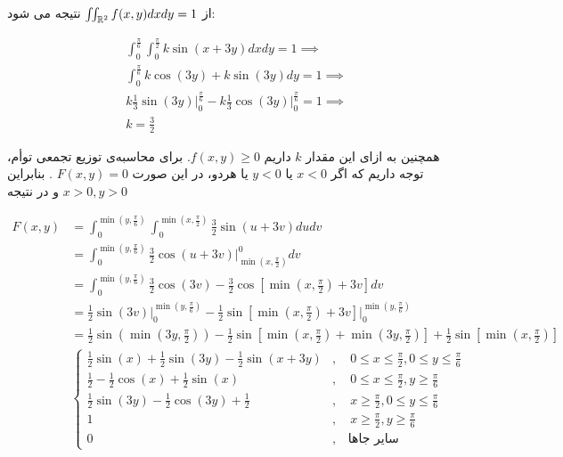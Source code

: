 \documentclass{article}
\newcommand{\eqn}[1]{
\begin{equation}\begin{split}
#1
\end{split}\end{equation}
}
\begin{document}
از 
$
\iint_{\Bbb R^2}f(x,y)dxdy=1
$
نتیجه می شود:
\eqn{
&\int_0^\frac{\pi}{6}\int_0^\frac{\pi}{2}k\sin(x+3y)dxdy=1\implies
\\&\int_0^\frac{\pi}{6}k\cos(3y)+k\sin(3y)dy=1\implies
\\&k\frac{1}{3}\sin(3y)\Big|_0^\frac{\pi}{6}-k\frac{1}{3}\cos(3y)\Big|_0^\frac{\pi}{6}=1\implies
\\&k=\frac{3}{2}
}
همچنین به ازای این مقدار $k$ داریم
$
f(x,y)\ge 0
$.
برای محاسبه‌ی توزیع تجمعی توأم، توجه داریم که اگر 
$
x<0
$
یا 
$
y<0
$
یا هردو، در این صورت
$
F(x,y)=0
$
.
بنابراین 
$
x>0,y>0
$
و در نتیجه
\eqn{
F(x,y)&=
\int_0^{\min(y,\frac{\pi}{6})}\int_0^{\min(x,\frac{\pi}{2})} \frac{3}{2}\sin(u+3v)dudv
\\&=
\int_0^{\min(y,\frac{\pi}{6})} \frac{3}{2}\cos(u+3v)\Big|_{\min(x,\frac{\pi}{2})}^0dv
\\&=
\int_0^{\min(y,\frac{\pi}{6})} \frac{3}{2}\cos(3v)-\frac{3}{2}\cos\left[\min(x,\frac{\pi}{2})+3v\right]dv
\\&=
\frac{1}{2}\sin(3v)\Big|_0^{\min(y,\frac{\pi}{6})}-\frac{1}{2}\sin\left[\min(x,\frac{\pi}{2})+3v\right]\Big|_0^{\min(y,\frac{\pi}{6})}
\\&=
\frac{1}{2}\sin(\min(3y,\frac{\pi}{2}))-\frac{1}{2}\sin\left[\min(x,\frac{\pi}{2})+\min(3y,\frac{\pi}{2})\right]+
\frac{1}{2}\sin\left[\min(x,\frac{\pi}{2})\right]
\\&
\begin{cases}
\frac{1}{2}\sin(x)+\frac{1}{2}\sin(3y)-\frac{1}{2}\sin(x+3y)
&,\quad 0\le x\le \frac{\pi}{2},0\le y\le \frac{\pi}{6}\\
\frac{1}{2}-\frac{1}{2}\cos(x)+\frac{1}{2}\sin(x)
&,\quad 0\le x\le \frac{\pi}{2},y\ge \frac{\pi}{6}\\
\frac{1}{2}\sin(3y)-\frac{1}{2}\cos(3y)+\frac{1}{2}
&,\quad x\ge \frac{\pi}{2},0\le y\le \frac{\pi}{6}\\
1
&,\quad x\ge \frac{\pi}{2},y\ge \frac{\pi}{6}\\
0&,\quad \text{سایر جاها}
\end{cases}
}


%
\end{document}
